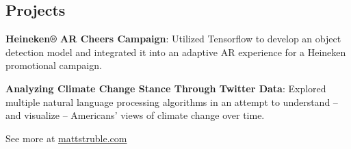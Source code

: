 \documentclass[margin]{res}
\begin{document}
\begin{resume}
\section{Projects} 
\phantom{spacing}
\par
\textbf{Heineken® AR Cheers Campaign}: 
Utilized Tensorflow to develop an object detection model and integrated it into an adaptive AR experience for a Heineken promotional campaign. 

\par
\textbf{Analyzing Climate Change Stance Through Twitter Data}:
Explored multiple natural language processing algorithms in an attempt to understand -- and visualize -- Americans' views of climate change over time.

\hfill See more at \href{http://mattstruble.com}{mattstruble.com}




\end{resume}
\end{document}

